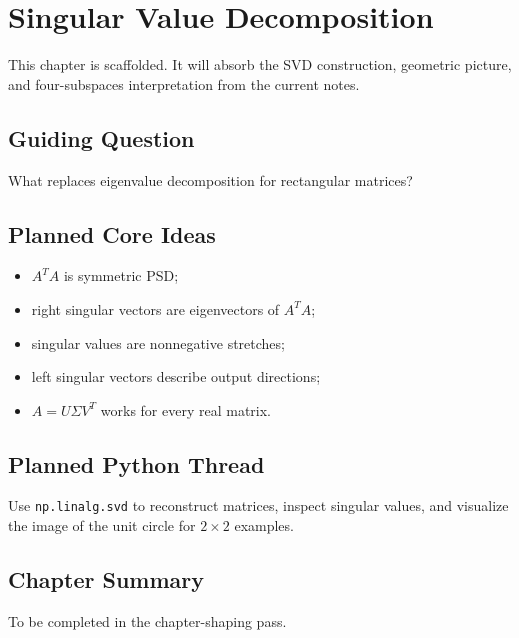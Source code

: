 \chapter{Singular Value Decomposition}
\label{ch:svd}

\begin{draftbox}
This chapter is scaffolded. It will absorb the SVD construction, geometric
picture, and four-subspaces interpretation from the current notes.
\end{draftbox}

\section{Guiding Question}

What replaces eigenvalue decomposition for rectangular matrices?

\section{Planned Core Ideas}

\begin{itemize}
  \item $A^TA$ is symmetric PSD;
  \item right singular vectors are eigenvectors of $A^TA$;
  \item singular values are nonnegative stretches;
  \item left singular vectors describe output directions;
  \item $A=U\Sigma V^T$ works for every real matrix.
\end{itemize}

\section{Planned Python Thread}

Use \texttt{np.linalg.svd} to reconstruct matrices, inspect singular values,
and visualize the image of the unit circle for $2\times 2$ examples.

\section*{Chapter Summary}

To be completed in the chapter-shaping pass.


